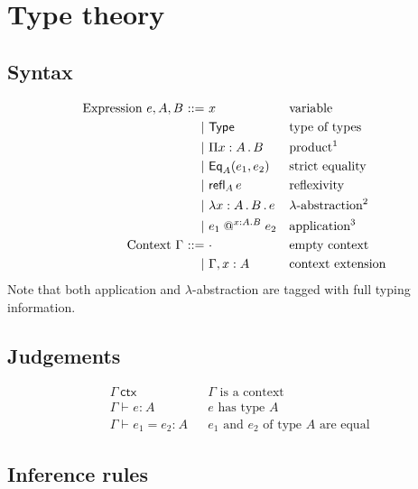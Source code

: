 \documentclass{article}
\makeatletter
\newcommand{\Type}{\mathsf{Type}}
\newcommand{\ctx}{\Gamma}
\newcommand{\emptyctx}{\cdot}
\newcommand{\isctx}[1]{#1\ \mathsf{ctx}}
\newcommand{\of}[1][]{:_{#1}}
\newcommand{\prd}[1]{\Pi #1 \,.\,}
\newcommand{\Eq}[3][]{\mathsf{Eq}_{#1}(#2, #3)}
\newcommand{\refl}[2][]{\mathsf{refl}_{#1}\,#2}
\newcommand{\lam}[1]{\lambda #1 \,.\,}
\newcommand{\abs}[1]{#1 .}
\newcommand{\app}[3][]{#2 \mathrel{@}^{#1} #3}
\newcommand{\ent}[1][]{\vdash_{#1}}
\newcommand{\bnfis}{\mathbin{{:}{:}{=}}}
\newcommand{\bnfor}{\mathbin{\mid}}
\makeatother
\begin{document}
\section{Type theory}

\subsection{Syntax}

\begin{align*}
  \text{Expression}\ e, A, B \
    \bnfis \ & x                              & & \text{variable}\\
    \bnfor \ & \Type                          & & \text{type of types}\\
    \bnfor \ & \prd{x : A} B                  & & \text{product\footnotemark} \\
    \bnfor \ & \Eq[A]{e_1}{e_2}               & & \text{strict equality} \\
    \bnfor \ & \refl[A]{e}                    & & \text{reflexivity} \\
    \bnfor \ & \lam{x : A \,.\, B} e          & & \text{$\lambda$-abstraction\footnotemark} \\
    \bnfor \ & \app[\abs{x : A} B]{e_1}{e_2}  & & \text{application\footnotemark}
  \\
  \text{Context}\ \ctx\
     \bnfis \ & \emptyctx                     & & \text{empty context} \\
     \bnfor \ & \ctx, x : A                   & & \text{context extension}
\end{align*}
%
%
%
\footnotetext{$x$ is bound in $B$}%
%
Note that both application and $\lambda$-abstraction are tagged with full typing information.


\subsection{Judgements}

\begin{align*}
  & \isctx{\ctx}                & & \text{$\ctx$ is a context}  \\
  & \ctx \ent e \of A         & & \text{$e$ has type $A$}  \\
  & \ctx \ent e_1 = e_2 \of A & & \text{$e_1$ and $e_2$ of type $A$ are equal}
\end{align*}

\subsection{Inference rules}
\end{document}
